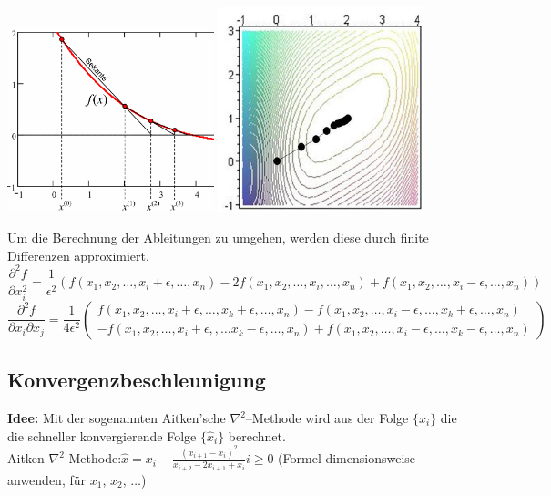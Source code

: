 \begin{minipage}{6cm}
   \includegraphics[width=6cm]{./Content/NonLinearOptimization/QuasiNewton1D.png}
   \includegraphics[width=6cm]{./Content/NonLinearOptimization/newton.png}
\end{minipage}


  Um die Berechnung der Ableitungen zu umgehen, werden diese durch finite Differenzen approximiert. 
  $$\frac{\partial^2 f}{\partial x_i^2} = \frac{1}{\epsilon^2} 
  \left( f(x_1, x_2, \ldots, x_i+\epsilon, \ldots, x_n) - 2 f(x_1, x_2, \ldots, x_i, \ldots, x_n) + f(x_1, x_2, \ldots, x_i-\epsilon, \ldots, x_n) \right)$$
  $$\frac{\partial^2 f}{\partial x_i \partial x_j} = \frac{1}{4 \epsilon^2} \begin{pmatrix}
    f(x_1, x_2, \ldots, x_i+\epsilon, \ldots, x_k+\epsilon, \ldots, x_n) - f(x_1, x_2, \ldots, x_i-\epsilon, \ldots, x_k+\epsilon, \ldots, x_n)\\
    -f(x_1, x_2, \ldots, x_i+\epsilon, , \ldots x_k-\epsilon, \ldots, x_n) + f(x_1, x_2, \ldots, x_i-\epsilon, \ldots, x_k-\epsilon, \ldots, x_n)
  \end{pmatrix}$$
 
 \subsection{Konvergenzbeschleunigung}
 \textbf{Idee:} Mit der sogenannten Aitken'sche   $\nabla^2$–Methode wird aus der Folge $\{x_i\}$ die die schneller konvergierende Folge $\{\hat{x}_i\}$ berechnet.\\
 
 Aitken $\nabla^2$-Methode:\quad $\boxed{\hat{x}=x_i-\frac{(x_{i+1}-x_i)^2}{x_{i+2}-2x_{i+1}+x_{i}}}$\qquad $i\geq 0$ \qquad (Formel dimensionsweise anwenden, für $x_1$, $x_2$, $\ldots$)
 
 
 

  
